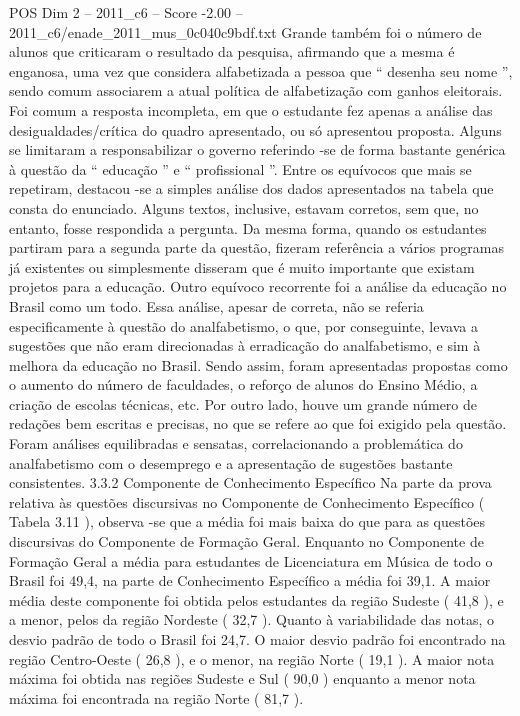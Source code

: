 \begin{textsample}{POS Dim 2 – 2011\_c6 – Score -2.00 – 2011\_c6/enade\_2011\_mus\_0c040c9bdf.txt}
Grande também foi o número de alunos que criticaram o resultado da pesquisa, afirmando que a mesma é enganosa, uma vez que considera alfabetizada a pessoa que “ desenha seu nome ”, sendo comum associarem a atual política de alfabetização com ganhos eleitorais.
Foi comum a resposta incompleta, em que o estudante fez apenas a análise das desigualdades/crítica do quadro apresentado, ou só apresentou proposta.
Alguns se limitaram a responsabilizar o governo referindo -se de forma bastante genérica à questão da “ educação ” e “ profissional ”.
Entre os equívocos que mais se repetiram, destacou -se a simples análise dos dados apresentados na tabela que consta do enunciado.
Alguns textos, inclusive, estavam corretos, sem que, no entanto, fosse respondida a pergunta.
Da mesma forma, quando os estudantes partiram para a segunda parte da questão, fizeram referência a vários programas já existentes ou simplesmente disseram que é muito importante que existam projetos para a educação.
Outro equívoco recorrente foi a análise da educação no Brasil como um todo.
Essa análise, apesar de correta, não se referia especificamente à questão do analfabetismo, o que, por conseguinte, levava a sugestões que não eram direcionadas à erradicação do analfabetismo, e sim à melhora da educação no Brasil.
Sendo assim, foram apresentadas propostas como o aumento do número de faculdades, o reforço de alunos do Ensino Médio, a criação de escolas técnicas, etc.
Por outro lado, houve um grande número de redações bem escritas e precisas, no que se refere ao que foi exigido pela questão.
Foram análises equilibradas e sensatas, correlacionando a problemática do analfabetismo com o desemprego e a apresentação de sugestões bastante consistentes. 3.3.2 Componente de Conhecimento Específico Na parte da prova relativa às questões discursivas no Componente de Conhecimento Específico ( Tabela 3.11 ), observa -se que a média foi mais baixa do que para as questões discursivas do Componente de Formação Geral.
Enquanto no Componente de Formação Geral a média para estudantes de Licenciatura em Música de todo o Brasil foi 49,4, na parte de Conhecimento Específico a média foi 39,1.
A maior média deste componente foi obtida pelos estudantes da região Sudeste ( 41,8 ), e a menor, pelos da região Nordeste ( 32,7 ).
Quanto à variabilidade das notas, o desvio padrão de todo o Brasil foi 24,7.
O maior desvio padrão foi encontrado na região Centro-Oeste ( 26,8 ), e o menor, na região Norte ( 19,1 ).
A maior nota máxima foi obtida nas regiões Sudeste e Sul ( 90,0 ) enquanto a menor nota máxima foi encontrada na região Norte ( 81,7 ).

\end{textsample}
